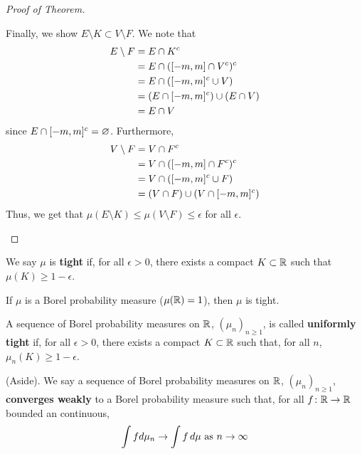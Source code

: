 \documentclass[11pt,leqno,oneside]{amsbook}
\numberwithin{thm}{section}
\renewcommand{\emptyset}{\varnothing}
\renewcommand{\de}{\textbf} %
\begin{document}
\begin{proof}[Proof of Theorem]
\begin{itemize}
      Finally, we show $E \setminus K \subset V \setminus F$. We note
      that
      \begin{align*}
        E \setminus F & = E \cap K^c \\
                      & = E \cap ([-m,m] \cap V^c)^c \\
                      & = E \cap ([-m,m]^c \cup V) \\
                      & = (E \cap [-m,m]^c) \cup (E \cap
                        V)\\
                      & = E \cap V
      \end{align*}
      since $E \intersect [-m,m]^c = \emptyset$. Furthermore,
      \begin{align*}
        V \setminus F & = V \cap F^c \\
                      & = V \cap ([-m,m] \cap F^c)^c \\
                      & = V \cap ([-m,m]^c \cup F) \\
        & = (V \cap F) \cup (V \cap [-m,m]^c)
      \end{align*}
      Thus, we get that $\mu(E \setminus K) \leq \mu(V \setminus F)
      \leq \epsilon$ for all $\epsilon$.
    \end{itemize}
  \end{proof}
  \begin{defn}
    We say $\mu$ is \de{tight} if, for all $\epsilon > 0$, there
    exists a compact $K \subset {\mathbb R}$ such that $\mu(K) \geq
    1-\epsilon$.
  \end{defn}
  \begin{cor}
    If $\mu$ is a Borel probability measure ($\mu({\mathbb R}) = 1$), then
    $\mu$ is tight.
  \end{cor}
  \begin{defn}
    A sequence of Borel probability measures on ${\mathbb R}$, $(\mu_n)_{n \geq
    1}$, is called \de{uniformly tight} if, for all $\epsilon > 0$,
  there exists a compact $K \subset {\mathbb R}$ such that, for all $n$,
  $\mu_n(K) \geq 1 - \epsilon$.
  \end{defn}
  \begin{defn}
    (Aside). We say a sequence of Borel probability measures on ${\mathbb R}$,
    $(\mu_n)_{n \geq 1}$, \de{converges weakly} to a Borel probability
    measure such that, for all $f \colon {\mathbb R} \to {\mathbb R}$ bounded an
    continuous, \[
      \int f d \mu_n \to \int f \, d\mu \text{ as } n \to \infty
    \]
  \end{defn}
\end{document}
